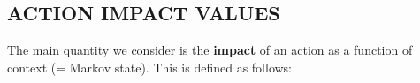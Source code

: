 \documentclass[]{article}
\begin{document}
%

\subsection{ACTION IMPACT VALUES}
\label{subsec:action-values}

The main quantity we consider is the \textbf{impact} of an action as a function of context (= Markov state). This is defined as follows:
\end{document}
